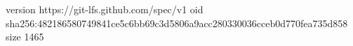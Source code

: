 version https://git-lfs.github.com/spec/v1
oid sha256:482186580749841ce5c6bb69c3d5806a9acc280330036cceb0d770fea735d858
size 1465
